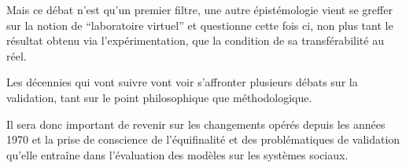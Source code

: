 



Mais ce débat n'est qu'un premier filtre, une autre épistémologie vient se greffer sur la notion de \enquote{laboratoire virtuel} et questionne cette fois ci, non plus tant le résultat obtenu via l'expérimentation, que la condition de sa transférabilité au réel.

Les décennies qui vont suivre vont voir s'affronter plusieurs débats sur la validation, tant sur le point philosophique que méthodologique.


Il sera donc important de revenir sur les changements opérés depuis les années 1970 et la prise de conscience de l'équifinalité et des problématiques de validation qu'elle entraîne dans l'évaluation des modèles sur les systèmes sociaux.





